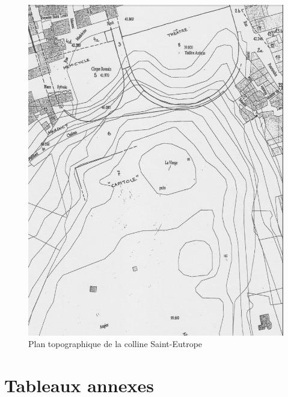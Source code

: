 \begin{figure}[!h]
	\includegraphics[width=\linewidth]{images/colline}
	\caption[Plan topographique de la colline Saint-Eutrope]{Plan topographique de la colline Saint-Eutrope \cite[p.11]{orangeTxt}}
	\label{colline} 
\end{figure} 		

\section{Tableaux annexes}

 
 